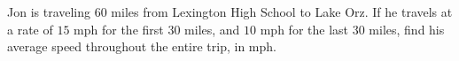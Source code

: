 Jon is traveling $60$ miles from Lexington High School to Lake Orz. If he travels at a rate of $15$ mph for the first $30$ miles, and $10$ mph for the last $30$ miles, find his average speed throughout the entire trip, in mph.
